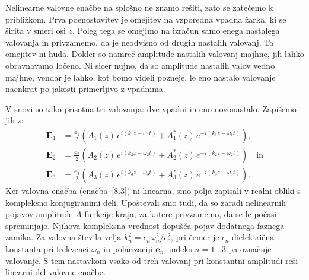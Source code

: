 Nelinearne valovne enačbe na splošno ne znamo rešiti, zato se zatečemo k približkom.
Prva poenostavitev je omejitev na vzporedna vpadna žarka,
ki se širita v smeri osi $z$. Poleg tega se omejimo na izračun samo enega
nastalega valovanja in privzamemo, da je neodvisno od drugih nastalih valovanj.
Ta omejitev ni huda. Dokler so namreč amplitude nastalih valovanj majhne, 
jih lahko obravnavamo ločeno. Ni sicer nujno,
da so amplitude nastalih valov vedno majhne, vendar je lahko, kot bomo videli 
pozneje, le eno nastalo valovanje naenkrat po jakosti primerljivo z vpadnima. 

V snovi so tako prisotna tri valovanja:
dve vpadni in eno novonastalo. Zapišemo jih z: 
\begin{align}
\mathbf{E}_{1} & =  \frac{\mathbf{e}_{1}}{2}\left(A_{1}(z)\, 
e^{i(k_{1}z-\omega_{1}t)}+A_{1}^{*}(z)\, e^{-i(k_{1}z-\omega_{1}t)}\right)\!\!,\nonumber \\
\mathbf{E}_{2} & =  \frac{\mathbf{e}_{2}}{2}\left(A_{2}(z)\, 
e^{i(k_{2}z-\omega_{2}t)}+A_{2}^{*}(z)\, e^{-i(k_{2}z-\omega_{2}t)}\right) \quad \mathrm{in} \nonumber \\
\mathbf{E}_{3} & =  \frac{\mathbf{e}_{3}}{2}\left(A_{3}(z)\, 
e^{i(k_{3}z-\omega_{3}t)}+A_{3}^{*}(z)\, e^{-i(k_{3}z-\omega_{3}t)}\right)\!\!.
\end{align}
Ker valovna enačba (enačba~\ref{8.3}) ni linearna, smo polja 
zapisali v realni obliki s kompleksno konjugiranimi
deli. Upoštevali smo tudi,
da so zaradi nelinearnih pojavov amplitude $A$ funkcije kraja, za
katere privzamemo, da se le počasi spreminjajo. Njihova kompleksna vrednost
dopušča pojav dodatnega faznega zamika. Za valovna
števila velja $k_{n}^{2}=\epsilon_{n}\omega_n^{2}/c_0^{2}$,
pri čemer je $\epsilon_{n}$ dielektrična konstanta pri frekvenci
$\omega_{n}$ in polarizaciji $\mathbf{e}_{n}$, indeks $n = 1...3$ pa označuje
valovanje. S tem nastavkom vsako od treh valovanj
pri konstantni amplitudi reši linearni del valovne enačbe. 

